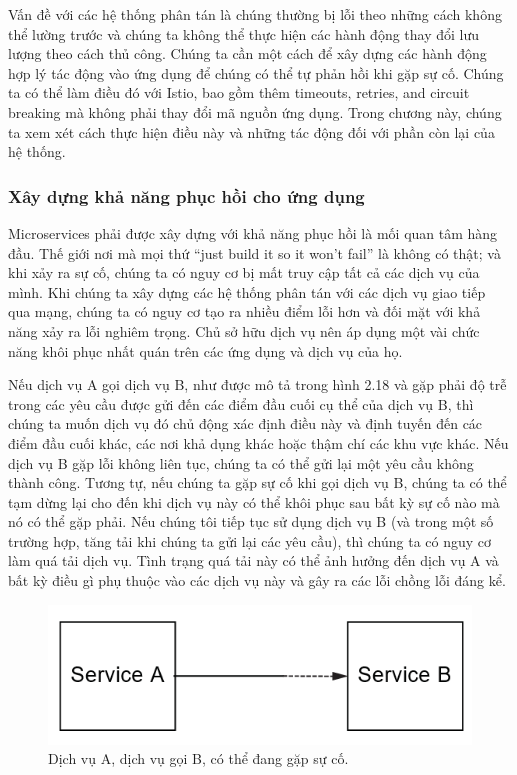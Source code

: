 \documentclass[12pt,a4paper]{report}
\begin{document}
Vấn đề với các hệ thống phân tán là chúng thường bị lỗi theo những cách không thể lường trước và chúng ta không thể thực hiện các hành động thay đổi lưu lượng theo cách thủ công. Chúng ta cần một cách để xây dựng các hành động hợp lý tác động vào ứng dụng để chúng có thể tự phản hồi khi gặp sự cố. Chúng ta có thể làm điều đó với Istio, bao gồm thêm timeouts, retries, and circuit breaking mà không phải thay đổi mã nguồn ứng dụng. Trong chương này, chúng ta xem xét cách thực hiện điều này và những tác động đối với phần còn lại của hệ thống.
			\subsubsection{Xây dựng khả năng phục hồi cho ứng dụng}
\hspace{0.6cm}Microservices phải được xây dựng với khả năng phục hồi là mối quan tâm hàng đầu. Thế giới nơi mà mọi thứ “just build it so it won’t fail” là không có thật; và khi xảy ra sự cố, chúng ta có nguy cơ bị mất truy cập tất cả các dịch vụ của mình. Khi chúng ta xây dựng các hệ thống phân tán với các dịch vụ giao tiếp qua mạng, chúng ta có nguy cơ tạo ra nhiều điểm lỗi hơn và đối mặt với khả năng xảy ra lỗi nghiêm trọng. Chủ sở hữu dịch vụ nên áp dụng một vài chức năng khôi phục nhất quán trên các ứng dụng và dịch vụ của họ.

Nếu dịch vụ A gọi dịch vụ B, như được mô tả trong hình 2.18 và gặp phải độ trễ trong các yêu cầu được gửi đến các điểm đầu cuối cụ thể của dịch vụ B, thì chúng ta muốn dịch vụ đó chủ động xác định điều này và định tuyến đến các điểm đầu cuối khác, các nơi khả dụng khác hoặc thậm chí các khu vực khác. Nếu dịch vụ B gặp lỗi không liên tục, chúng ta có thể gửi lại một yêu cầu không thành công. Tương tự, nếu chúng ta gặp sự cố khi gọi dịch vụ B, chúng ta có thể tạm dừng lại cho đến khi dịch vụ này có thể khôi phục sau bất kỳ sự cố nào mà nó có thể gặp phải. Nếu chúng tôi tiếp tục sử dụng dịch vụ B (và trong một số trường hợp, tăng tải khi chúng ta gửi lại các yêu cầu), thì chúng ta có nguy cơ làm quá tải dịch vụ. Tình trạng quá tải này có thể ảnh hưởng đến dịch vụ A và bất kỳ điều gì phụ thuộc vào các dịch vụ này và gây ra các lỗi chồng lỗi đáng kể.
\begin{figure}[h]
	\centering
	\includegraphics[width=0.7\linewidth]{Pics/2.2.3-p1}
	\caption{Dịch vụ A, dịch vụ gọi B, có thể đang gặp sự cố.}
	\label{fig:2.2.3-1}
\end{figure}
\end{document}
